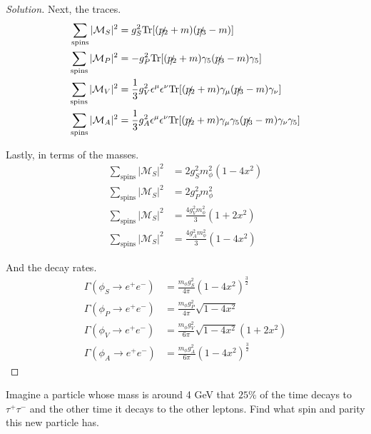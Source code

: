 \documentclass[12pt]{article}
\newenvironment{questionpart}[2][Part]{\begin{trivlist}
\item[\hskip \labelsep \hskip \labelsep {\bfseries (#2)}]}{\end{trivlist}}
\newenvironment{solution}{\begin{proof}[Solution]}{\end{proof}}
\begin{document}
\begin{solution}
Next, the traces.
\begin{align*}
    \sum_\text{spins}|\mathcal{M}_S|^2&=g_S^2\text{Tr}[(\slashed{p_2}+m) (\slashed{p_3}-m)] \\
    \sum_\text{spins}|\mathcal{M}_P|^2&=-g_P^2\text{Tr}[(\slashed{p_2}+m) \gamma_5(\slashed{p_3}-m)\gamma_5] \\
    \sum_\text{spins}|\mathcal{M}_V|^2&=\frac{1}{3}g_V^2\epsilon^\mu\epsilon^\nu\text{Tr}[(\slashed{p_2}+m) \gamma_\mu(\slashed{p_3}-m)\gamma_\nu] \\
    \sum_\text{spins}|\mathcal{M}_A|^2&=\frac{1}{3}g_A^2\epsilon^\mu\epsilon^\nu\text{Tr}[(\slashed{p_2}+m) \gamma_\mu\gamma_5(\slashed{p_3}-m)\gamma_\nu\gamma_5]
\end{align*}

Lastly, in terms of the masses.
\begin{align*}
    \sum_\text{spins}|\mathcal{M}_S|^2&=2g_S^2m_\phi^2(1-4x^2) \\
    \sum_\text{spins}|\mathcal{M}_S|^2&=2g_P^2m_\phi^2 \\
    \sum_\text{spins}|\mathcal{M}_S|^2&=\frac{4g_V^2m_\phi^2}{3}(1+2x^2) \\
    \sum_\text{spins}|\mathcal{M}_S|^2&=\frac{4g_A^2m_\phi^2}{3}(1-4x^2)
\end{align*}

And the decay rates.
\begin{align*}
    \Gamma(\phi_S\rightarrow e^+e^-)&=\frac{m_\phi g_S^2}{4\pi}(1-4x^2)^\frac{3}{2} \\
    \Gamma(\phi_P\rightarrow e^+e^-)&=\frac{m_\phi g_P^2}{4\pi}\sqrt{1-4x^2} \\
    \Gamma(\phi_V\rightarrow e^+e^-)&=\frac{m_\phi g_V^2}{6\pi}\sqrt{1-4x^2} (1+2x^2) \\
    \Gamma(\phi_A\rightarrow e^+e^-)&=\frac{m_\phi g_A^2}{6\pi}(1-4x^2)^\frac{3}{2}
\end{align*}

\end{solution}

\begin{questionpart}{c}
Imagine a particle whose mass is around 4 GeV that $25\%$ of the time decays to $\tau^+\tau^-$ and the other time it decays to the other leptons. Find what spin and parity this new particle has.
\end{questionpart}
\end{document}

